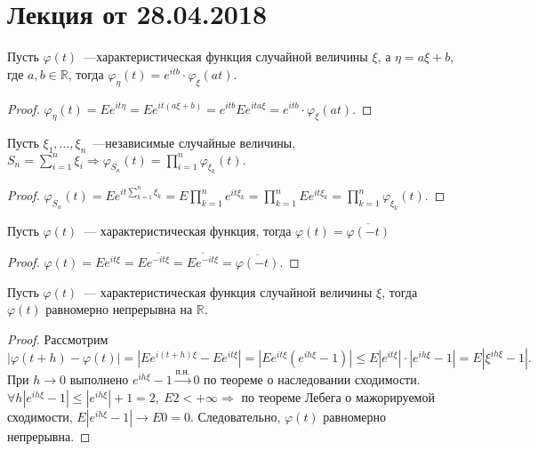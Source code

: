 \section{Лекция от 28.04.2018}

	\begin{property}
		Пусть \(\varphi(t)\)~---характеристическая функция случайной величины \(\xi\), а \(\eta = a\xi + b\), где \(a, b \in \mathbb{R}\), тогда \(\varphi_\eta(t) = e^{itb}\cdot \varphi_\xi(at).\)
		\begin{proof}
			\(\varphi_\eta(t) = Ee^{it\eta} = Ee^{it(a\xi + b)} = e^{itb}Ee^{ita\xi} = e^{itb}\cdot \varphi_\xi(at).\)
		\end{proof}
	\end{property}

	\begin{property}
		Пусть \(\xi_1, \ldots, \xi_n\)~---независимые случайные величины, \(S_n = \sum\limits_{i = 1}^{n}\xi_i \Rightarrow \varphi_{S_n}(t) = \prod\limits_{i = 1}^n\varphi_{\xi_k}(t).\)  
		\begin{proof}
			\(\varphi_{S_n}(t) = Ee^{it \sum\limits_{k = 1}^{n}\xi_k} = E\prod\limits_{k = 1}^n e^{it\xi_k} = \prod\limits_{k = 1}^{n}Ee^{it\xi_k} = \prod\limits_{k = 1}^{n}\varphi_{\xi_k}(t).\)
		\end{proof}
	\end{property}
	\begin{property}
		Пусть \(\varphi(t)\)~--- характеристическая функция, тогда \(\varphi(t) = \overline{\varphi(-t)}\)
		\begin{proof}
			\(\varphi(t) = Ee^{it\xi} = E\overline{e^{-it\xi}} = \overline{Ee^{-it\xi}} = \overline{\varphi(-t)}.\)
		\end{proof}
	\end{property}
	\begin{property}
		Пусть \(\varphi(t)\)~--- характеристическая функция случайной величины \(\xi\), тогда \(\varphi(t)\) равномерно непрерывна на \(\mathbb{R}.\)
		\begin{proof}
			Рассмотрим \(|\varphi(t + h) - \varphi(t)| = |Ee^{i(t+h)\xi} - Ee^{it\xi}| = |Ee^{it\xi}(e^{ih\xi} - 1)| \leqslant E|e^{it\xi}|\cdot |e^{ih\xi} - 1| = E|\xi^{ih\xi} - 1|.\)
			При \(h \to 0\) выполнено \(e^{ih\xi} - 1 \overset{\text{п.н.}} \longrightarrow 0 \) по теореме о наследовании сходимости. \(\forall h |e^{ih\xi} - 1| \leqslant |e^{ih\xi}| + 1 = 2, ~ E2 < +\infty \Rightarrow\) по теореме Лебега о мажорируемой сходимости, \(E|e^{ih\xi} - 1| \to E0 = 0.\) Следовательно, \(\varphi(t)\) равномерно непрерывна.
		\end{proof}
	\end{property}
